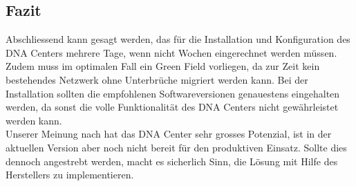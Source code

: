 \subsection{Fazit}
Abschliessend kann gesagt werden, das für die Installation und Konfiguration des DNA Centers mehrere Tage, wenn nicht Wochen eingerechnet werden müssen. Zudem muss im optimalen Fall ein Green Field vorliegen, da zur Zeit kein bestehendes Netzwerk ohne Unterbrüche migriert werden kann. Bei der Installation sollten die empfohlenen Softwareversionen genauestens eingehalten werden, da sonst die volle Funktionalität des DNA Centers nicht gewährleistet werden kann. \\
Unserer Meinung nach hat das DNA Center sehr grosses Potenzial, ist in der aktuellen Version aber noch nicht bereit für den produktiven Einsatz. Sollte dies dennoch angestrebt werden, macht es sicherlich Sinn, die Lösung mit Hilfe des Herstellers zu implementieren.
